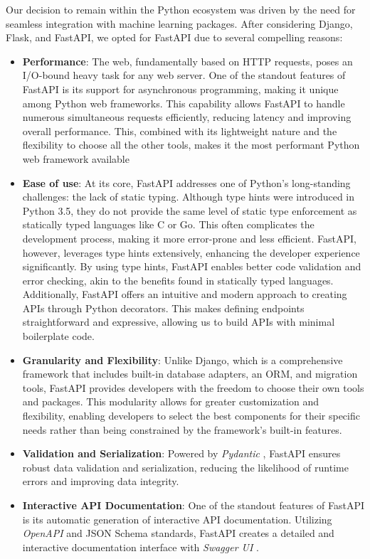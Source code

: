 Our decision to remain within the Python ecosystem was driven by the need for seamless integration with machine learning packages. After considering Django, Flask, and FastAPI, we opted for FastAPI due to several compelling reasons:

\begin{itemize}
    \item \textbf{Performance}: The web, fundamentally based on HTTP requests, poses an I/O-bound heavy task for any web server. One of the standout features of FastAPI is its support for asynchronous programming, making it unique among Python web frameworks. This capability allows FastAPI to handle numerous simultaneous requests efficiently, reducing latency and improving overall performance. This, combined with its lightweight nature and the flexibility to choose all the other tools, makes it the most performant Python web framework available
    \item \textbf{Ease of use}: At its core, FastAPI addresses one of Python's long-standing challenges: the lack of static typing. Although type hints were introduced in Python 3.5, they do not provide the same level of static type enforcement as statically typed languages like C or Go. This often complicates the development process, making it more error-prone and less efficient. FastAPI, however, leverages type hints extensively, enhancing the developer experience significantly. By using type hints, FastAPI enables better code validation and error checking, akin to the benefits found in statically typed languages. Additionally, FastAPI offers an intuitive and modern approach to creating APIs through Python decorators. This makes defining endpoints straightforward and expressive, allowing us to build APIs with minimal boilerplate code.
    \item \textbf{Granularity and Flexibility}: Unlike Django, which is a comprehensive framework that includes built-in database adapters, an ORM, and migration tools, FastAPI provides developers with the freedom to choose their own tools and packages. This modularity allows for greater customization and flexibility, enabling developers to select the best components for their specific needs rather than being constrained by the framework’s built-in features.
    \item \textbf{Validation and Serialization}: Powered by \textit{Pydantic} \cite{pydantic}, FastAPI ensures robust data validation and serialization, reducing the likelihood of runtime errors and improving data integrity.
    \item \textbf{Interactive API Documentation}: One of the standout features of FastAPI is its automatic generation of interactive API documentation. Utilizing \textit{OpenAPI} \cite{openapi} and JSON Schema standards, FastAPI creates a detailed and interactive documentation interface with \textit{Swagger UI} \cite{swagger}.
\end{itemize}

